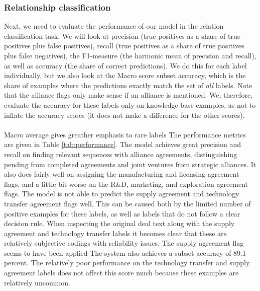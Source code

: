 \subsubsection{Relationship classification}
Next, we need to evaluate the performance of our model in the relation classification task. We will look at precision (true positives as a share of true positives plus false positives), recall (true positives as a share of true positives plus false negatives), the F1-measure (the harmonic mean of precision and recall), as well as accuracy (the share of correct predictions). We do this for each label individually, but we also look at the Macro score subset accuracy, which is the share of examples where the predictions exactly match the set of \textit{all} labels. Note that the alliance flags only make sense if an alliance is mentioned. We, therefore, evaluate the accuracy for these labels only on knowledge base examples, as not to inflate the accuracy scores (it does not make a difference for the other scores). \\\\
Macro average gives greather emphasis to rare labels
The performance metrics are given in Table \ref{tab:performance}. The model achieves great precision and recall on finding relevant sequences with alliance agreements, distinguishing pending from completed agreements and joint ventures from strategic alliances. It also does fairly well on assigning the manufacturing and licensing agreement flags, and a little bit worse on the R\&D, marketing, and exploration agreement flags. The model is not able to predict the supply agreement and technology transfer agreement flags well. This can be caused both by the limited number of positive examples for these labels, as well as labels that do not follow a clear decision rule. When inspecting the original deal text along with the supply agreement and technology transfer labels it becomes clear that these are relatively subjective codings with reliability issues. The supply agreement flag seems to have been applied The system also achieves a subset accuracy of 89.1 percent. The relatively poor performance on the technology transfer and supply agreement labels does not affect this score much because these examples are relatively uncommon.
